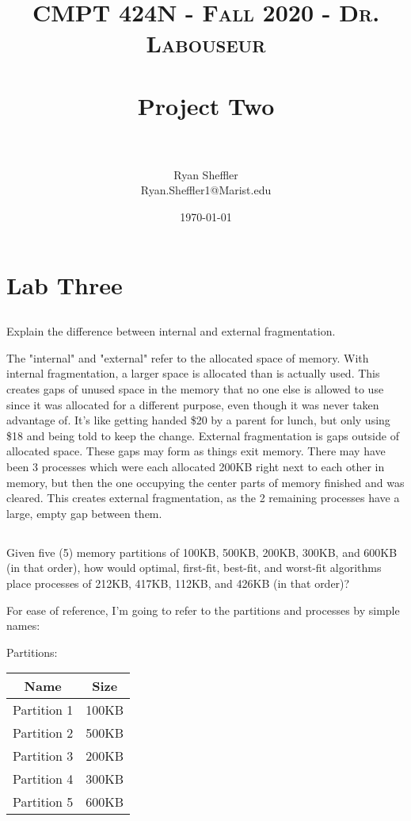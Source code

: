 \documentclass[letterpaper, 10pt,DIV=13]{scrartcl}
\title{	
   \normalfont \normalsize 
   \textsc{CMPT 424N - Fall 2020 - Dr. Labouseur} \\[10pt] %
   \horrule{0.5pt} \\[0.25cm] 	%
   \huge Project Two  \\     	    %
   \horrule{0.5pt} \\[0.25cm] 	%
}
\author{Ryan Sheffler \\ \normalsize Ryan.Sheffler1@Marist.edu}
\date{\normalsize\today} 	%
\numberwithin{equation}{section} %
\numberwithin{figure}{section} %
\numberwithin{table}{section} %
\begin{document}
\maketitle %

\section{Lab Three}

\subsection{}
Explain the difference between internal and external fragmentation.

The "internal" and "external" refer to the allocated space of memory. With internal fragmentation, a larger space is allocated than is actually used. This creates gaps of unused space in the memory that no one else is allowed to use since it was allocated for a different purpose, even though it was never taken advantage of. It's like getting handed \$20 by a parent for lunch, but only using \$18 and being told to keep the change. External fragmentation is gaps outside of allocated space. These gaps may form as things exit memory. There may have been 3 processes which were each allocated 200KB right next to each other in memory, but then the one occupying the center parts of memory finished and was cleared. This creates external fragmentation, as the 2 remaining processes have a large, empty gap between them.
\subsection{}
Given five (5) memory partitions of 100KB, 500KB, 200KB, 300KB, and 600KB (in that order), how would optimal, first-fit, best-fit, and worst-fit algorithms place processes of 212KB, 417KB, 112KB, and 426KB (in that order)?

For ease of reference, I'm going to refer to the partitions and processes by simple names:

\begin{center}
Partitions:
\newline
\begin{tabular}{ |c|c| } 
\hline
Name & Size \\
\hline
\hline
Partition 1 & 100KB \\
\hline
Partition 2 & 500KB \\
\hline
Partition 3 & 200KB \\
\hline
Partition 4 & 300KB \\
\hline
Partition 5 & 600KB \\
\hline
\end{tabular}
\end{center}
\end{document}
